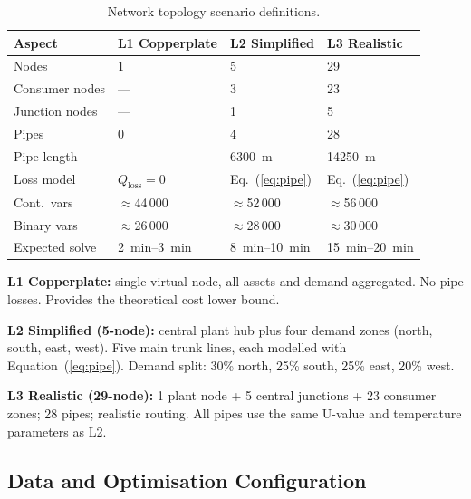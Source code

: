 \documentclass[a4paper,fleqn]{cas-sc}
\newcommand{\Qloss}{Q_{\mathrm{loss}}}
\begin{document}
\begin{table}
\caption{Network topology scenario definitions.}
\label{tab:scenarios}
\begin{tabularx}{\linewidth}{lXXX}
\toprule
Aspect & L1 Copperplate & L2 Simplified & L3 Realistic \\
\midrule
Nodes         & 1           & 5            & 29 \\
Consumer nodes & ---         & 3            & 23 \\
Junction nodes & ---         & 1            & 5  \\
Pipes          & 0           & 4            & 28 \\
Pipe length    & ---         & \SI{6300}{m} & \SI{14250}{m} \\
Loss model     & $\Qloss=0$  & Eq.~(\ref{eq:pipe}) & Eq.~(\ref{eq:pipe}) \\
Cont.\ vars    & $\approx$44\,000 & $\approx$52\,000 & $\approx$56\,000 \\
Binary vars    & $\approx$26\,000 & $\approx$28\,000 & $\approx$30\,000 \\
Expected solve & \SIrange{2}{3}{min} & \SIrange{8}{10}{min} & \SIrange{15}{20}{min} \\
\bottomrule
\end{tabularx}
\end{table}

\textbf{L1 Copperplate:} single virtual node, all assets and demand
aggregated.  No pipe losses.  Provides the theoretical cost lower bound.

\textbf{L2 Simplified (5-node):} central plant hub plus four demand zones
(north, south, east, west).  Five main trunk lines, each modelled with
Equation~(\ref{eq:pipe}).  Demand split: 30\% north, 25\% south, 25\%
east, 20\% west.

\textbf{L3 Realistic (29-node):} 1 plant node + 5 central junctions +
23 consumer zones; 28 pipes; realistic routing.  All pipes use the same
U-value and temperature parameters as L2.

\subsection{Data and Optimisation Configuration}
\end{document}
